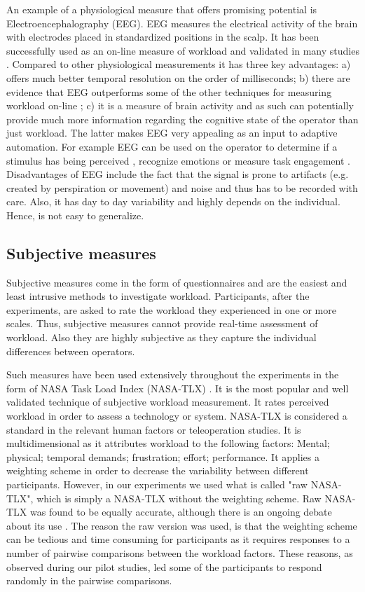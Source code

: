 \documentclass[a4paper,12pt,oneside,openright]{bhamthesis}
\begin{document}
An example of a physiological measure that offers promising potential is Electroencephalography (EEG). EEG measures the electrical activity of the brain with electrodes placed in standardized positions in the scalp. It has been successfully used as an on-line measure of workload and validated in many studies \cite{Wilson2007,Wilson2003,Wilson2000,Kothe2011,Prinzel2003}. Compared to other physiological measurements it has three key advantages: a) offers much better temporal resolution on the order of milliseconds; b) there are evidence that EEG outperforms some of the other techniques for measuring workload on-line \cite{Wilson2003a}; c) it is a measure of brain activity and as such can potentially provide much more information regarding the cognitive state of the operator than just workload. The latter makes EEG very appealing as an input to adaptive automation. For example EEG can be used on the operator to determine if a stimulus has being perceived \cite{Wyble2006a}, recognize emotions \cite{Schaaff2009} or measure task engagement \cite{Berka2007a}. Disadvantages of EEG include the fact that the signal is prone to artifacts (e.g. created by perspiration or movement) and noise and thus has to be recorded with care. Also, it has day to day variability \cite{Christensen2012} and highly depends on the individual. Hence, is not easy to generalize.

\subsection{Subjective measures}
Subjective measures come in the form of questionnaires and are the easiest and least intrusive methods to investigate workload. Participants, after the experiments, are asked to rate the workload they experienced in one or more scales. Thus, subjective measures cannot provide real-time assessment of workload. Also they are highly subjective as they capture the individual differences between operators. 

Such measures have been used extensively throughout the experiments in the form of NASA Task Load Index (NASA-TLX) \cite{Hart1988}. It is the most popular and well validated technique \cite{Hart2006} of subjective workload measurement. It rates perceived workload in order to assess a technology or system. NASA-TLX is considered a standard in the relevant human factors or teleoperation studies. It is multidimensional as it attributes workload to the following factors: Mental; physical; temporal demands; frustration; effort; performance. It applies a weighting scheme in order to decrease the variability between different participants. However, in our experiments we used what is called "raw NASA-TLX", which is simply a NASA-TLX without the weighting scheme. Raw NASA-TLX was found to be equally accurate, although there is an ongoing debate about its use \cite{Hart2006}. The reason the raw version was used, is that the weighting scheme can be tedious and time consuming for participants as it requires responses to a number of pairwise comparisons between the workload factors. These reasons, as observed during our pilot studies, led some of the participants to respond randomly in the pairwise comparisons.
\end{document}
